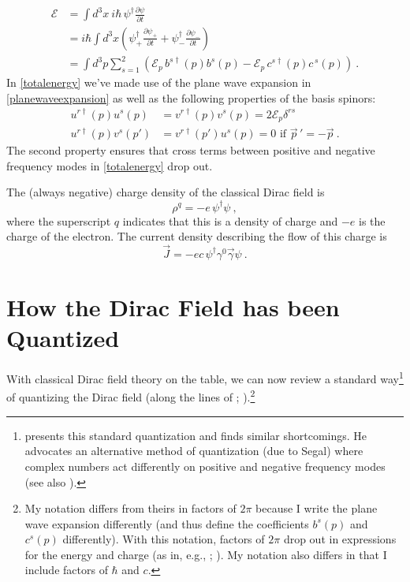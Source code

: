 \documentclass[onecolumn,secnumarabic,amsmath,amssymb,balancelastpage,nofootinbib]{article}
\begin{document}
\begin{align}
\mathcal{E}&=\int{d^3 x \ i \hbar \, \psi^\dagger\frac{\partial \psi}{\partial t}}
\nonumber
\\
&=i \hbar \int{d^3 x \left( \psi_+^\dagger\frac{\partial \psi_+}{\partial t} + \psi_-^\dagger\frac{\partial \psi_-}{\partial t}\right)}
\nonumber
\\
&=\int{d^3 p \sum_{s=1}^2  \left(\mathcal{E}_p\,b^{s\dagger}(p)b^s(p)-\mathcal{E}_p\,c^{s\dagger}(p)c^{\,s}(p)\right)}
\ .
\label{totalenergy}
\end{align}
In \eqref{totalenergy} we've made use of the plane wave expansion in \eqref{planewaveexpansion} as well as the following properties of the basis spinors:
\begin{align}
u^{r\dagger} (p) u^s (p) &= v^{r\dagger} (p) v^s (p) = 2 \mathcal{E}_p \delta^{r s}
\nonumber
\\
u^{r\dagger} (p)v^s (p')&=v^{r \dagger} (p')u^s (p)=0\mbox{ \ \ if \ \ } \vec{p}\,'=-\vec{p}
\ .
\end{align}
The second property ensures that cross terms between positive and negative frequency modes in \eqref{totalenergy} drop out.


The (always negative) charge density of the classical Dirac field is
\begin{equation}
\rho^q=-e\, \psi^\dagger \psi
\ ,
\label{diracchargedensity}
\end{equation}
where the superscript $q$ indicates that this is a density of charge and $-e$ is the charge of the electron.  The current density describing the flow of this charge is
\begin{equation}
\vec{J}=-e c\, \psi^{\dagger} \gamma^0 \vec{\gamma} \psi
\label{chargecurrentcomplex}
\ .
\end{equation}

\section{How the Dirac Field has been Quantized}\label{howwasquantized}

With classical Dirac field theory on the table, we can now review a standard way\footnote{\citet{saunders1991} presents this standard quantization and finds similar shortcomings.  He advocates an alternative method of quantization (due to Segal) where complex numbers act differently on positive and negative frequency modes (see also \citealp{saunders1992, wallace2009}).} of quantizing the Dirac field (along the lines of \citealp[sec.\ 3.5]{peskinschroeder}; \citealp[ch.\ 5]{tong}).\footnote{My notation differs from theirs in factors of $2\pi$ because I write the plane wave expansion differently (and thus define the coefficients $b^s (p)$ and $c^s (p)$ differently).  With this notation, factors of $2\pi$ drop out in expressions for the energy and charge (as in, e.g., \citealp[ch.\ 8]{schweberQFT}; \citealp[sec.\ 13.4]{bjorkendrellfields}).  My notation also differs in that I include factors of $\hbar$ and $c$.}  
\end{document}
